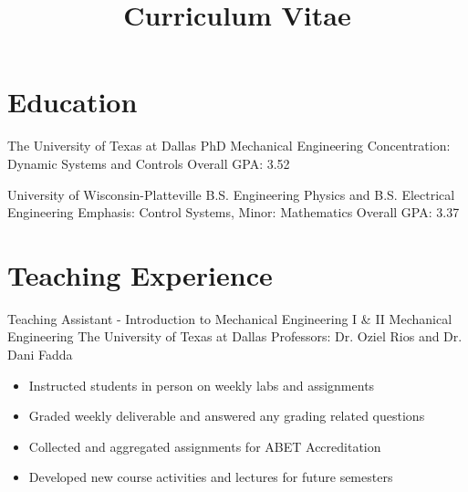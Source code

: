 \documentclass[11pt,letterpaper,roman]{moderncv} %
\title{Curriculum Vitae}
\begin{document}

\makecvtitle %

\vspace{- 1 cm}

\section{Education}

{The University of Texas at Dallas}
{PhD Mechanical Engineering}{}
{Concentration: Dynamic Systems and Controls} 
{Overall GPA: 3.52}

{University of Wisconsin-Platteville}
{B.S. Engineering Physics and  B.S. Electrical Engineering}{}
{Emphasis: Control Systems, Minor: Mathematics} 
{Overall GPA: 3.37}




\section{Teaching Experience}

{Teaching Assistant - Introduction to Mechanical Engineering I \& II}
{Mechanical Engineering}
{The University of Texas at Dallas}
{Professors: Dr. Oziel Rios and Dr. Dani Fadda}
{\begin{itemize}
    \item Instructed students in person on weekly labs and assignments
    \item Graded weekly deliverable and answered any grading related questions
    \item Collected and aggregated assignments for ABET Accreditation
    \item Developed new course activities and lectures for future semesters
\end{itemize}}
\end{document}
